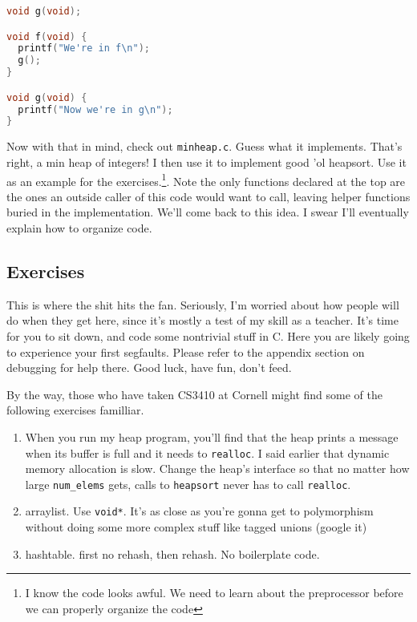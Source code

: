 \documentclass[ebook,11pt,oneside,openany]{memoir}
\newcommand{\cf}[1]{\texttt{#1}}
\begin{document}
\begin{lstlisting}[language=C]
void g(void);

void f(void) {
  printf("We're in f\n");
  g();
}

void g(void) {
  printf("Now we're in g\n");
}
\end{lstlisting}


Now with that in mind, check out \cf{minheap.c}. Guess what it implements. That's right, a min heap of integers! I then use it to implement good 'ol heapsort. Use it as an example for the exercises.\footnote{I know the code looks awful. We need to learn about the preprocessor before we can properly organize the code}. Note the only functions declared at the top are the ones an outside caller of this code would want to call, leaving helper functions buried in the implementation. We'll come back to this idea. I swear I'll eventually explain how to organize code.

\subsection{Exercises}

This is where the shit hits the fan. Seriously, I'm worried about how people will do when they get here, since it's mostly a test of my skill as a teacher. It's time for you to sit down, and code some nontrivial stuff in C. Here you are likely going to experience your first segfaults. Please refer to the appendix section on debugging for help there. Good luck, have fun, don't feed.

\noindent
By the way, those who have taken CS3410 at Cornell might find some of the following exercises familliar.

\begin{enumerate}

\item When you run my heap program, you'll find that the heap prints a message when its buffer is full and it needs to \cf{realloc}. I said earlier that dynamic memory allocation is slow. Change the heap's interface so that no matter how large \cf{num\_elems} gets, calls to \cf{heapsort} never has to call \cf{realloc}.

\item arraylist. Use \cf{void*}. It's as close as you're gonna get to polymorphism without doing some more complex stuff like tagged unions (google it)

\item hashtable. first no rehash, then rehash. No boilerplate code.

\end{enumerate}
\end{document}
